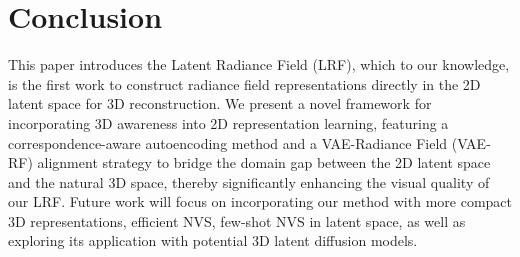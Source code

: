 \section{Conclusion }
This paper introduces the Latent Radiance Field (LRF), which to our knowledge, is the first work to construct radiance field representations directly in the 2D latent space for 3D reconstruction. We present a novel framework for incorporating 3D awareness into 2D representation learning, featuring a correspondence-aware autoencoding method and a VAE-Radiance Field (VAE-RF) alignment strategy to bridge the domain gap between the 2D latent space and the natural 3D space, thereby significantly enhancing the visual quality of our LRF.
Future work will focus on incorporating our method with more compact 3D representations, efficient NVS, few-shot NVS in latent space, as well as exploring its application with potential 3D latent diffusion models.
